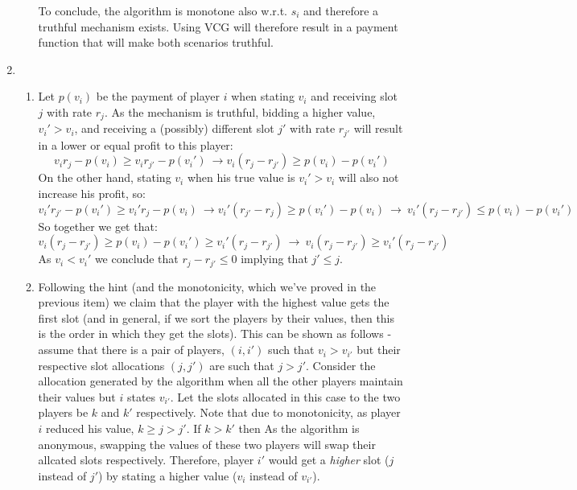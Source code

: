\documentclass[a4page,notitlepage]{article}
\begin{document}
\begin{enumerate}
\begin{enumerate}
        To conclude, the algorithm is monotone also w.r.t. $s_i$ and therefore a truthful mechanism exists.
        Using VCG will therefore result in a payment function that will make both scenarios truthful.
  \end{enumerate}
  \item
    \begin{enumerate}
    \item 
      Let $p(v_i)$ be the payment of player $i$ when stating $v_i$ and receiving slot $j$ with rate $r_j$.
      As the mechanism is truthful, bidding a higher value, $v_i'>v_i$, and receiving a (possibly) different slot $j'$ with rate $r_{j'}$ will result in a lower or equal profit to this player:
      \begin{equation*}
        v_ir_j-p(v_i)\geq v_ir_{j'}-p(v_i')\ \rightarrow v_i(r_j-r_{j'})\geq p(v_i)-p(v_i')
      \end{equation*}
      On the other hand, stating $v_i$ when his true value is $v_i'>v_i$ will also not increase his profit, so:
      \begin{equation*}
        v_i'r_{j'}-p(v_i')\geq v_i'r_j-p(v_i)\ \rightarrow v_i'(r_{j'}-r_j)\geq p(v_i')-p(v_i)\ \rightarrow \ v_i'(r_j-r_{j'})\leq p(v_i)-p(v_i')
      \end{equation*}
      So together we get that:
      \begin{equation*}
        v_i(r_j-r_{j'})\geq p(v_i)-p(v_i')\geq v_i'(r_j-r_{j'})\ \rightarrow \ v_i(r_j-r_{j'})\geq v_i'(r_j-r_{j'})
      \end{equation*}
      As $v_i < v_i'$ we conclude that $r_j-r_{j'}\leq 0$ implying that $j'\leq j$.
    \item
      Following the hint (and the monotonicity, which we've proved in the previous item) we claim that the player with the highest value gets the first slot (and in general, if we sort the players by their values, then this is the order in which they get the slots).
      This can be shown as follows - assume that there is a pair of players, $(i,i')$ such that $v_i>v_{i'}$ but their respective slot allocations $(j,j')$ are such that $j>j'$.
      Consider the allocation generated by the algorithm when all the other players maintain their values but $i$ states $v_{i'}$.
      Let the slots allocated in this case to the two players be $k$ and $k'$ respectively.
      Note that due to monotonicity, as player $i$ reduced his value, $k\geq j> j'$.
      If $k>k'$ then 
      As the algorithm is anonymous, swapping the values of these two players will swap their allcated slots respectively.
      Therefore, player $i'$ would get a \emph{higher} slot ($j$ instead of $j'$) by stating a higher value ($v_i$ instead of $v_{i'}$).
    \end{enumerate}
\end{enumerate}
\end{document}
